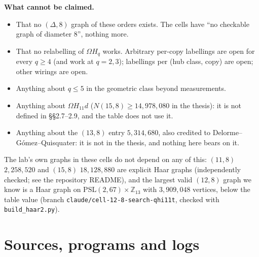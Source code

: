 \documentclass[11pt]{amsart}
\newcommand{\file}[1]{\nolinkurl{#1}}
\theoremstyle{plain}
\theoremstyle{definition}
\theoremstyle{remark}
\newcommand{\Om}{\Omega}
\begin{document}
\noindent\textbf{What cannot be claimed.}
\begin{itemize}[leftmargin=1.5em]
\item That no $(\Delta, 8)$ graph of these orders exists. The cells have ``no checkable graph of diameter $8$'', nothing
  more.
\item That no relabelling of $\Om H_q$ works. Arbitrary per-copy labellings are open for every $q \ge 4$ (and work at
  $q = 2, 3$); labellings per (hub class, copy) are open; other wirings are open.
\item Anything about $q \le 5$ in the geometric class beyond measurements.
\item Anything about $\Om H_{11}d$ ($N(15,8) \ge 14{,}978{,}080$ in the thesis): it is not defined in \S\S2.7--2.9, and
  the table does not use it.
\item Anything about the $(13,8)$ entry $5{,}314{,}680$, also credited to Delorme--Gómez--Quisquater: it is not in the
  thesis, and nothing here bears on it.
\end{itemize}

The lab's own graphs in these cells do not depend on any of this: $(11,8)$ $2{,}258{,}520$ and $(15,8)$ $18{,}128{,}880$
are explicit Haar graphs (independently checked; see the repository README), and the largest valid $(12,8)$ graph we
know is a Haar graph on $\mathrm{PSL}(2,67) \times \mathbb{Z}_{13}$ with $3{,}909{,}048$ vertices, below the table value (branch \file{claude/cell-12-8-search-qhi11t}, checked with \file{build_haar2.py}).

\section{Sources, programs and logs}\label{sec:sources}
\begingroup\raggedright
\end{document}
